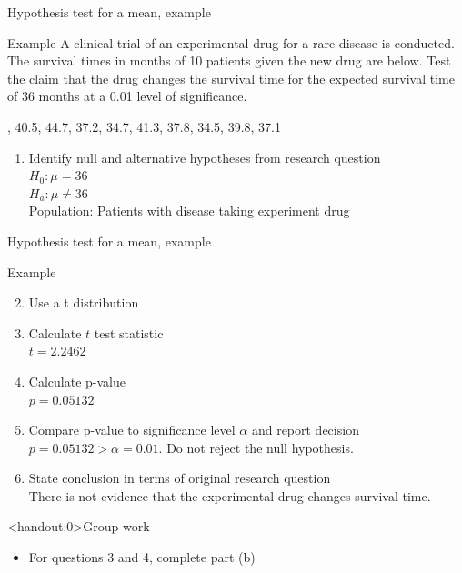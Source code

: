 \documentclass[xcolor=table]{beamer}
\begin{document}
\begin{frame}{Hypothesis test for a mean, example}
\begin{exampleblock}{Example}
\large
A clinical trial of an experimental drug for a rare disease is conducted. The survival times in months of 10 patients given the new drug are below. Test the claim that the drug changes the survival time for the expected survival time of 36 months at a 0.01 level of significance.\\
\medskip
{, 40.5, 44.7, 37.2, 34.7, 41.3, 37.8, 34.5, 39.8, 37.1
\par}
\begin{enumerate}
\pause\item Identify null and alternative hypotheses from research question\\
\pause$H_0: \mu = 36$\\
$H_a: \mu \ne 36$\\
Population: Patients with disease taking experiment drug
\end{enumerate}
\end{exampleblock}
\end{frame}

\begin{frame}{Hypothesis test for a mean, example}
\begin{exampleblock}{Example}
\large
\begin{enumerate}
\setcounter{enumi}{1}

\item Use a t distribution
\pause\item Calculate $t$ test statistic\\
\pause$t=2.2462$
\pause\item Calculate p-value\\
\pause$p = 0.05132$
\pause\item Compare p-value to significance level $\alpha$ and report decision\\
\pause$p = 0.05132 > \alpha = 0.01$. Do not reject the null hypothesis.
\pause\item State conclusion in terms of original research question\\
\pause There is not evidence that the experimental drug changes survival time.
\end{enumerate}

\end{exampleblock}
\end{frame}

\begin{frame}<handout:0>{Group work}
\begin{block}{}
\large
\begin{itemize}
\item For questions 3 and 4, complete part (b)
\end{itemize}
\end{block}
\end{frame}
\end{document}
